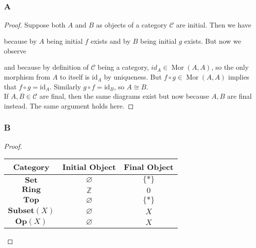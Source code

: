 \documentclass{article}
\newcommand{\Z}{\mathbb{Z}}
\newcommand{\id}{\mathrm{id}}
\newcommand{\fC}{\mathscr{C}}
\DeclareMathOperator{\Mor}{Mor}
\newcommand{\Ring}{\mathbf{Ring}} %
\newcommand{\Set}{\mathbf{Set}} %
\newcommand{\Top}{\mathbf{Top}} %
\newcommand{\Op}{\mathbf{Op}} %
\newcommand{\Ssubset}{\mathbf{Subset}} %
\let\emptyset\varnothing
\begin{document}
\subsection{}
\subsubsection{A}\label{1.3.A}
\begin{proof}
    Suppose both $A$ and $B$ as objects of a category $\fC$ are initial. Then we have
    \begin{center}
    \end{center}
    because by $A$ being initial $f$ exists and by $B$ being initial $g$ exists. But now we observe
    \begin{center}
    \end{center}
    and because by definition of $\fC$ being a category, $id_A\in \Mor(A,A)$, so the only morphism from $A$ to itself is $\id_A$ by uniqueness. But $f\circ g\in \Mor(A,A)$ implies that $f\circ g=\id_A$. Similarly $g\circ f=\id_B$, so $A\cong B$.\\
    \newline
    If $A,B\in \fC$ are final, then the same diagrams exist but now because $A,B$ are final instead. The same argument holds here.
\end{proof}
\subsubsection{B}\label{1.3.B}
\begin{proof}
    \begin{center}
\begin{tabular}{||c|c|c||} 
 \hline
 Category & Initial Object & Final Object\\ [0.5ex] 
 \hline\hline
 $\Set$ & $\emptyset$ & $\{*\}$ \\ 
 \hline
 $\Ring$ & $\Z$ & $0$ \\
 \hline
 $\Top$& $\emptyset$ & $\{*\}$\\
 \hline
 $\Ssubset(X)$& $\emptyset$ & $X$\\
 \hline
 $\Op(X)$& $\emptyset$& $X$\\
 \hline
\end{tabular}
\end{center}
\end{proof}
\end{document}

